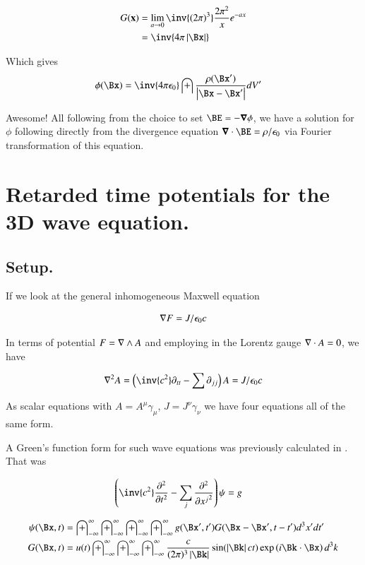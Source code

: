 \documentclass{article}
\newcommand{\PDSq}[2]{\frac{\partial^2 {#2}}{\partial {#1}^2}}
\newcommand{\IIinf}[0]{ \int_{-\infty}^\infty }
\begin{document}
\begin{align*}
G(\mathbf{x}) 
&= \lim_{a \rightarrow 0} \inv{(2\pi)^3} \frac{2 \pi^2}{x} e^{ - a x } \\
&= \inv{4\pi\Abs{\Bx}}
\end{align*}

Which gives
\begin{align*}
\phi(\Bx) &= \inv{4\pi \epsilon_0} \int \frac{\rho(\Bx')}{\Abs{\Bx - \Bx'}} dV'
\end{align*}

Awesome!  All following from the choice to set $\BE = -\spacegrad \phi$, we have a solution for $\phi$ following directly
from the divergence equation $\spacegrad \cdot \BE = \rho/\epsilon_0$ via Fourier transformation of this equation.

\section{ Retarded time potentials for the 3D wave equation. }

\subsection{ Setup. }

If we look at the general inhomogeneous Maxwell equation

\begin{align}
\nabla F = J/\epsilon_0 c
\end{align}

In terms of potential $F = \nabla \wedge A$ and employing in the Lorentz gauge $\nabla \cdot A = 0$, we have

\begin{align}
\grad^2 A = \left(\inv{c^2} \partial_{tt} - \sum \partial_{jj}\right) A = J/\epsilon_0 c
\end{align}

As scalar equations with $A = A^\mu \gamma_\mu$, $J = J^\nu \gamma_\nu$ we have four equations all of the same form.

A Green's function form for such wave equations was previously calculated in \cite{PJfourierMaxwellSecondOrder}.  That was

\begin{align}
\left( \inv{c^2} \PDSq{t}{} -\sum_j \PDSq{x^j}{} \right)\psi &= g
\end{align}

\begin{align}
{\psi}(\Bx, t) &= \IIinf \IIinf \IIinf \IIinf g(\Bx', t') G(\Bx - \Bx', t - t') d^3 x' dt' \\
G(\Bx, t) &= u(t) \IIinf \IIinf \IIinf \frac{c}{(2\pi)^3 \Abs{\Bk}} \sin( \Abs{\Bk} c t ) \exp\left( i \Bk \cdot \Bx \right) d^3 k
\end{align}
\end{document}
